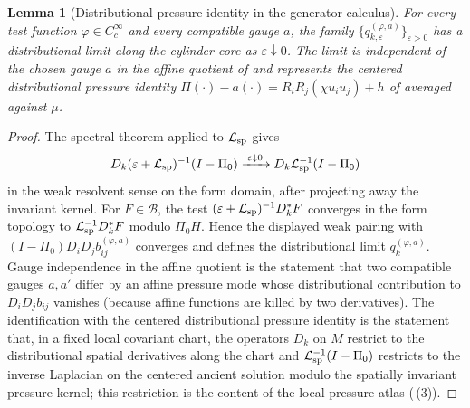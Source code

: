\documentclass[11pt]{amsart}
\numberwithin{equation}{section}
\theoremstyle{plain}
\newtheorem{lemma}[lemma]{Lemma}
\theoremstyle{definition}
\theoremstyle{remark}
\begin{document}
\begin{lemma}[Distributional pressure identity in the generator calculus]
\label{lem:generator-pressure-identity}
For every test function \(\varphi\in C_c^\infty\) and every compatible
gauge \(a\), the family
\(\{q_{k,\varepsilon}^{(\varphi,a)}\}_{\varepsilon>0}\) has a distributional
limit along the cylinder core as \(\varepsilon\downarrow0\).  The limit is
independent of the chosen gauge \(a\) in the affine quotient of
 and represents the centered
distributional pressure identity
\(\Pi(\cdot)-a(\cdot)=R_iR_j(\chi u_i u_j)+h\) of
 averaged against \(\mu\).
\end{lemma}

\begin{proof}
The spectral theorem applied to \(\mathcal L_{\rm sp}\) gives
\[
   D_k(\varepsilon+\mathcal L_{\rm sp})^{-1}(I-\Pi_0)
   \xrightarrow{\;\varepsilon\downarrow0\;}
   D_k\mathcal L_{\rm sp}^{-1}(I-\Pi_0)
\]
in the weak resolvent sense on the form domain, after projecting away the
invariant kernel.  For \(F\in\mathcal B\), the test
\((\varepsilon+\mathcal L_{\rm sp})^{-1}D_k^*F\) converges in the form topology to
\(\mathcal L_{\rm sp}^{-1}D_k^*F\) modulo \(\Pi_0H\).  Hence the displayed weak pairing
with \((I-\Pi_0)D_iD_jb_{ij}^{(\varphi,a)}\) converges and defines the
distributional limit \(q_k^{(\varphi,a)}\).  Gauge independence in the affine
quotient is the statement that two compatible
gauges \(a,a'\) differ by an affine pressure mode whose distributional
contribution to \(D_iD_j b_{ij}\) vanishes (because affine functions are
killed by two derivatives).  The identification with the centered
distributional pressure identity is the statement that, in a fixed local
covariant chart, the operators \(D_k\) on \(M\) restrict to the
distributional spatial derivatives along the chart and
\(\mathcal L_{\rm sp}^{-1}(I-\Pi_0)\) restricts to the inverse Laplacian on the
centered ancient solution modulo the spatially invariant pressure kernel; this
restriction is the
content of the local pressure atlas
(\,(3)).
\end{proof}
\end{document}
